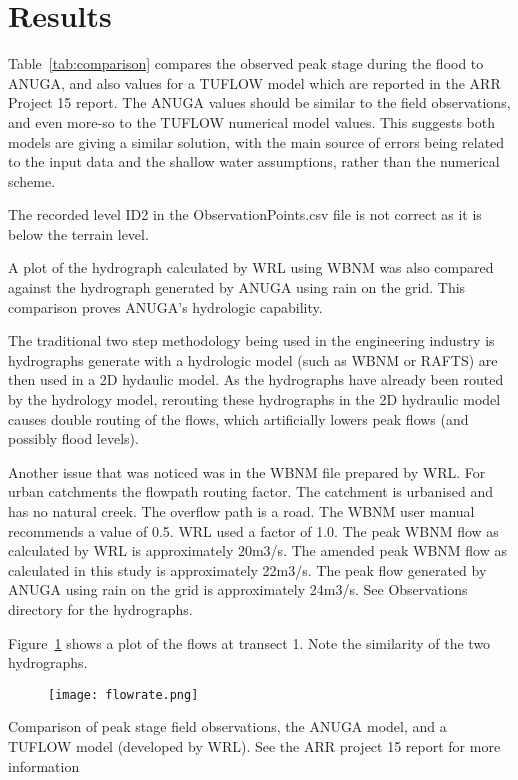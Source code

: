 \documentclass{article}
\begin{document}
\section{Results}
Table~\ref{tab:comparison} compares the observed peak stage during the flood to
ANUGA, and also values for a TUFLOW model which are reported in the ARR Project
15 report. The ANUGA values should be similar to the field observations, and
even more-so to the TUFLOW numerical model values. This suggests both models
are giving a similar solution, with the main source of errors being related to
the input data and the shallow water assumptions, rather than the numerical
scheme.

The recorded level ID2 in the ObservationPoints.csv file is not correct as it is below
the terrain level.

A plot of the hydrograph calculated by WRL using WBNM was also compared against the 
hydrograph generated by ANUGA using rain on the grid. This comparison proves ANUGA's hydrologic
capability. 

The traditional two step methodology being used in the engineering industry is hydrographs generate
with a hydrologic model (such as WBNM or RAFTS) are then used in a 2D hydaulic model.
As the hydrographs have already been routed by the hydrology model, rerouting these hydrographs 
in the 2D hydraulic model causes double routing of the flows, which artificially lowers peak flows 
(and possibly flood levels). 

Another issue that was noticed was in the WBNM file prepared by WRL. For urban catchments the flowpath 
routing factor. The catchment is urbanised and has no natural creek.
The overflow path is a road. The WBNM user manual recommends a value of 0.5. WRL used a factor of 1.0.
The peak WBNM flow as calculated by WRL is approximately 20m3/s.
The amended peak WBNM flow as calculated in this study is approximately 22m3/s. 
The peak flow generated by ANUGA using rain on the grid is approximately 24m3/s.
See Observations directory for the hydrographs.

Figure~\ref{fig:flowrate} shows a plot of the flows at transect 1. Note the similarity 
of the two hydrographs.
\begin{figure}
\texttt{[image: flowrate.png]}
\label{fig:flowrate}
\end{figure}  

\begin{table}
\caption{Comparison of peak stage field observations, the ANUGA model, and a
TUFLOW model (developed by WRL). See the ARR project 15 report for more
information}
\label{tab:comparison}
\end{table}
\end{document}

